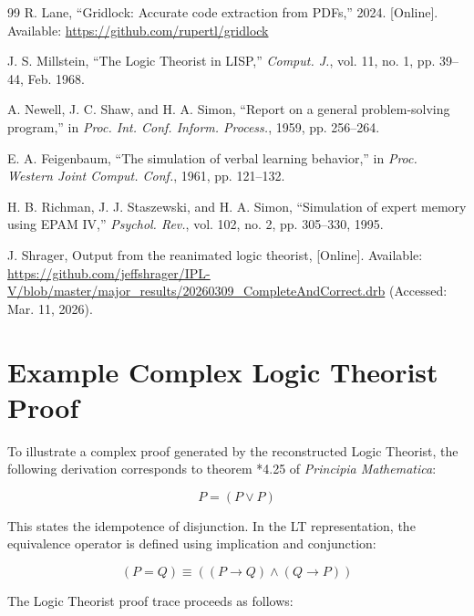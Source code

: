 \documentclass[journal]{IEEEtran}
\begin{document}
\begin{thebibliography}{99}
 R. Lane, ``Gridlock: Accurate code
  extraction from PDFs,'' 2024. [Online]. Available:
  \url{https://github.com/rupertl/gridlock}

 J. S. Millstein, ``The Logic Theorist in
  LISP,'' \textit{Comput. J.}, vol. 11, no. 1, pp. 39--44, Feb. 1968.

 A. Newell, J. C. Shaw, and H. A. Simon,
  ``Report on a general problem-solving program,'' in
  \textit{Proc. Int. Conf. Inform. Process.}, 1959, pp. 256--264.

 E. A. Feigenbaum, ``The simulation of
  verbal learning behavior,'' in \textit{Proc. Western Joint
    Comput. Conf.}, 1961, pp. 121--132.

 H. B. Richman, J. J. Staszewski, and
  H. A. Simon, ``Simulation of expert memory using EPAM IV,''
  \textit{Psychol. Rev.}, vol. 102, no. 2, pp. 305--330, 1995.

 J. Shrager, Output from the reanimated logic
  theorist, [Online]. Available:
  \url{https://github.com/jeffshrager/IPL-V/blob/master/major_results/20260309_CompleteAndCorrect.drb}
  (Accessed: Mar. 11, 2026).

\end{thebibliography}

\clearpage %
\onecolumn %

\appendix

\section{Example Complex Logic Theorist Proof}

To illustrate a complex proof generated by the reconstructed Logic Theorist, the following derivation corresponds to theorem *4.25 of \textit{Principia Mathematica}:

\[ P = (P \lor P) \]

This states the idempotence of disjunction. In the LT representation, the equivalence operator is defined using implication and conjunction:

\[ (P = Q) \equiv ((P \rightarrow Q) \land (Q \rightarrow P)) \]

The Logic Theorist proof trace proceeds as follows:
\end{document}
